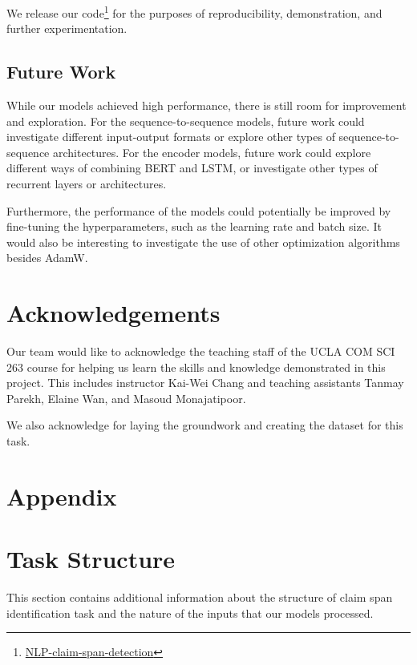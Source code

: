 \documentclass[11pt]{article}
\begin{document}
We release our code\footnote{\href{https://github.com/jpicchi18/NLP-claim-span-detection}{NLP-claim-span-detection}} for the purposes of reproducibility, demonstration, and further experimentation.

\subsection{Future Work}

While our models achieved high performance, there is still room for improvement and exploration. For the sequence-to-sequence models, future work could investigate different input-output formats or explore other types of sequence-to-sequence architectures. For the encoder models, future work could explore different ways of combining BERT and LSTM, or investigate other types of recurrent layers or architectures.

Furthermore, the performance of the models could potentially be improved by fine-tuning the hyperparameters, such as the learning rate and batch size. It would also be interesting to investigate the use of other optimization algorithms besides AdamW.

\section*{Acknowledgements}
Our team would like to acknowledge the teaching staff of the UCLA COM SCI 263 course for helping us learn the skills and knowledge demonstrated in this project. This includes instructor Kai-Wei Chang and teaching assistants Tanmay Parekh, Elaine Wan, and Masoud Monajatipoor.

We also acknowledge \cite{empowering-the-fact-checkers} for laying the groundwork and creating the dataset for this task.




\appendix

\section*{Appendix}
\section{Task Structure}
This section contains additional information about the structure of claim span identification task and the nature of the inputs that our models processed.
\end{document}
